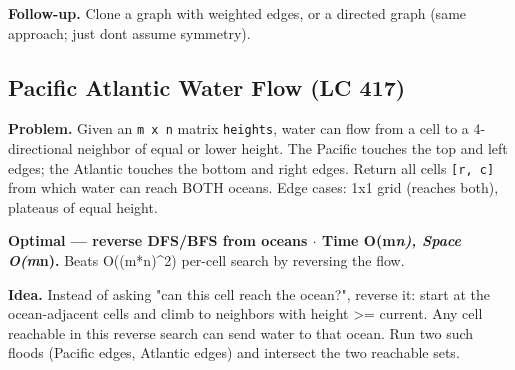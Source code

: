 \documentclass[11pt]{article}
\begin{document}
\textbf{Follow-up.} Clone a graph with weighted edges, or a directed graph (same approach; just don\textquotesingle t assume symmetry).

\subsection{Pacific Atlantic Water Flow (LC 417)}\label{pacific-atlantic-water-flow-lc-417}

\textbf{Problem.} Given an \texttt{m\ x\ n} matrix \texttt{heights}, water can flow from a cell to a 4-directional neighbor of equal or lower height. The Pacific touches the top and left edges; the Atlantic touches the bottom and right edges. Return all cells \texttt{{[}r,\ c{]}} from which water can reach BOTH oceans. Edge cases: 1x1 grid (reaches both), plateaus of equal height.

\textbf{Optimal --- reverse DFS/BFS from oceans \(\cdot\) Time O(m\emph{n), Space O(m}n).} Beats O((m*n)\^{}2) per-cell search by reversing the flow.

\textbf{Idea.} Instead of asking "can this cell reach the ocean?", reverse it: start at the ocean-adjacent cells and climb to neighbors with height \textgreater= current. Any cell reachable in this reverse search can send water to that ocean. Run two such floods (Pacific edges, Atlantic edges) and intersect the two reachable sets.

\end{document}
